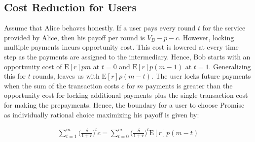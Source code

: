 \documentclass[runningheads]{llncs}
\newcommand{\sys}{Promise\xspace}
\begin{document}


\subsection{Cost Reduction for Users}
Assume that Alice behaves honestly.
If a user pays every round $t$ for the service provided by Alice, then his payoff per round is $V_B - p - c$. %
However, locking multiple payments incurs opportunity cost.
This cost is lowered at every time step as the payments are assigned to the intermediary.
Hence, Bob starts with an opportunity cost of $\mathrm{E}[r]pm$ at $t=0$ and $\mathrm{E}[r]p(m-1)$ at $t=1$.
Generalizing this for $t$ rounds, leaves us with $\mathrm{E}[r]p(m-t)$. %
The user locks future payments when the sum of the transaction costs $c$ for $m$ payments is greater than the opportunity cost for locking additional payments plus the single transaction cost for making the prepayments.
Hence, the boundary for a user to choose \sys as individually rational choice maximizing his payoff is given by:

\begin{align}
\label{eq:decision-bound-user}
    \sum_{t=1}^m \big( \frac{\delta}{1+r} \big)^t c = \sum_{t=0}^m \big( \frac{\delta}{1+r} \big)^t \mathrm{E}[r]p(m-t)
\end{align}
\end{document}
